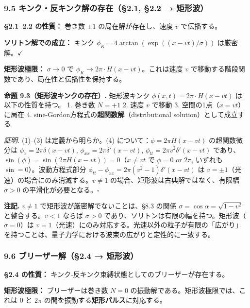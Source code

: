 \documentclass[a4paper,11pt]{ltjsarticle}
\begin{document}
\subsubsection{9.5 キンク・反キンク解の存在（§2.1, §2.2 →
矩形波）}\label{ux30adux30f3ux30afux53cdux30adux30f3ux30afux89e3ux306eux5b58ux57282.1-2.2-ux77e9ux5f62ux6ce2}

\textbf{§2.1--2.2 の性質：} 巻き数 \(\pm 1\) の局在解が存在し、速度
\(v\) で伝播する。

\textbf{ソリトン解での成立：} キンク
\(\phi_K = 4\arctan(\exp((x-vt)/\sigma))\) は厳密解。\(\checkmark\)

\textbf{矩形波極限：} \(\sigma \to 0\) で
\(\phi_K \to 2\pi \cdot H(x - vt)\)。これは速度 \(v\)
で移動する階段関数であり、局在性と伝播性を保持する。

\textbf{命題 9.3（矩形波キンクの存在）.} 矩形波キンク
\(\phi(x, t) = 2\pi \cdot H(x - vt)\) は以下の性質を持つ。 1. 巻き数
\(N = +1\) 2. 速度 \(v\) で移動 3. 空間の1点（\(x = vt\)）に局在 4.
sine-Gordon方程式の\textbf{超関数解}（distributional
solution）として成立する

\emph{証明.} (1)--(3) は定義から明らか。(4)
について：\(\phi = 2\pi H(x - vt)\) の超関数微分は
\(\phi_x = 2\pi\delta(x-vt)\), \(\phi_{xx} = 2\pi\delta'(x-vt)\),
\(\phi_{tt} = 2\pi v^2\delta'(x-vt)\)
であり、\(\sin(\phi) = \sin(2\pi H(x-vt)) = 0\)（\(x \neq vt\) で
\(\phi = 0\) or \(2\pi\), いずれも \(\sin = 0\)）。波動方程式部分
\(\phi_{tt} - \phi_{xx} = 2\pi(v^2-1)\delta'(x-vt)\) は
\(v = \pm 1\)（光速）の場合にのみ消滅する。\(v \neq 1\)
の場合、矩形波は古典解ではなく、有限幅 \(\sigma > 0\)
の平滑化が必要となる。\(\square\)

\textbf{注記.} \(v \neq 1\) で矩形波が厳密解でないことは、§8.3 の関係
\(\sigma = \cos\alpha = \sqrt{1-v^2}\) と整合する。\(v < 1\) ならば
\(\sigma > 0\)
であり、ソリトンは有限の幅を持つ。矩形波（\(\sigma = 0\)）は
\(v = 1\)（光速）にのみ対応する。光速以外の粒子が有限の「広がり」を持つことは、量子力学における波束の広がりと定性的に一致する。

\subsubsection{9.6 ブリーザー解（§2.4 →
矩形波）}\label{ux30d6ux30eaux30fcux30b6ux30fcux89e32.4-ux77e9ux5f62ux6ce2}

\textbf{§2.4 の性質：}
キンク-反キンク束縛状態としてのブリーザーが存在する。

\textbf{矩形波極限：} ブリーザーは巻き数 \(N = 0\)
の振動解である。矩形波極限では、これは \(0\) と \(2\pi\)
の間を振動する\textbf{矩形パルス}に対応する。
\end{document}
